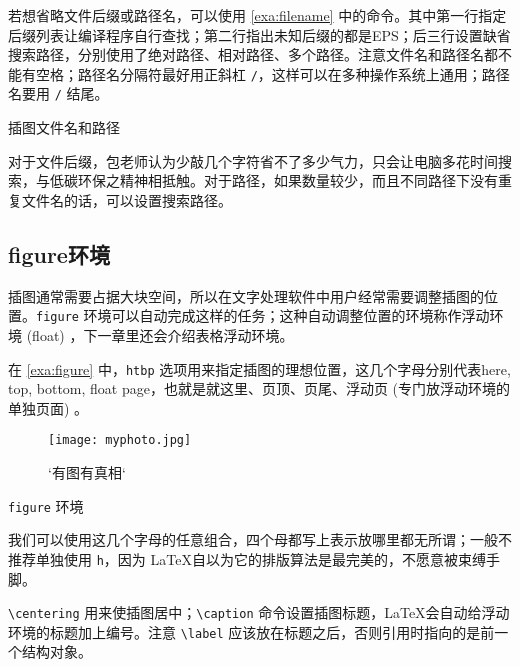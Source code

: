 若想省略文件后缀或路径名，可以使用 \autoref{exa:filename} 中的命令。其中第一行指定后缀列表让编译程序自行查找；第二行指出未知后缀的都是EPS；后三行设置缺省搜索路径，分别使用了绝对路径、相对路径、多个路径。注意文件名和路径名都不能有空格；路径名分隔符最好用正斜杠 \verb|/|，这样可以在多种操作系统上通用；路径名要用 \verb|/| 结尾。

\begin{example}[h]
\begin{Code}[numbers=left]
\graphicspath{{c:/secret-garden/}}
\graphicspath{{./img/}}
\graphicspath{{one-little/}{two-little/}{three-little-indians/}}
\end{Code}
\caption{插图文件名和路径}
\label{exa:filename}
\end{example}

对于文件后缀，包老师认为少敲几个字符省不了多少气力，只会让电脑多花时间搜索，与低碳环保之精神相抵触。对于路径，如果数量较少，而且不同路径下没有重复文件名的话，可以设置搜索路径。

\subsection{figure环境}

插图通常需要占据大块空间，所以在文字处理软件中用户经常需要调整插图的位置。\texttt{figure} 环境可以自动完成这样的任务；这种自动调整位置的环境称作浮动环境 (float) ，下一章里还会介绍表格浮动环境。

在 \autoref{exa:figure} 中，\texttt{htbp} 选项用来指定插图的理想位置，这几个字母分别代表here, top, bottom, float page，也就是就这里、页顶、页尾、浮动页 (专门放浮动环境的单独页面) 。

\begin{example}[h]
\begin{Code}[numbers=left]
\begin{figure}[htbp]
\centering
\texttt{[image: myphoto.jpg]}
\caption{`有图有真相`}
\label{fig:myphoto}
\end{figure}
\end{Code}
\caption{\texttt{figure} 环境}
\label{exa:figure}
\end{example}

我们可以使用这几个字母的任意组合，四个母都写上表示放哪里都无所谓；一般不推荐单独使用 \texttt{h}，因为 \LaTeX 自以为它的排版算法是最完美的，不愿意被束缚手脚。

\verb|\centering| 用来使插图居中；\verb|\caption| 命令设置插图标题，\LaTeX 会自动给浮动环境的标题加上编号。注意 \verb|\label| 应该放在标题之后，否则引用时指向的是前一个结构对象。

